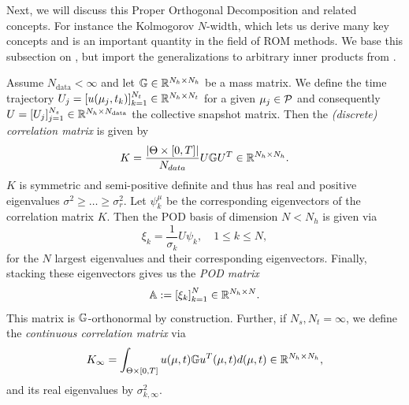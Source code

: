 Next, we will discuss this Proper Orthogonal Decomposition and related concepts. For instance the 
Kolmogorov $N$-width, which lets us derive many key concepts and is an important quantity in the field of ROM methods. 
We base this subsection on \cite{quarteroni2015rb}, but import the generalizations to arbitrary inner products from
\cite{franco2024}. 
\begin{definition} \label{def: POD}
    Assume $N_\text{data} < \infty$ and let $\mathbb{G} \in \mathbb{R}^{N_h \times N_h}$ be a mass matrix.
    We define the time trajectory $U_j = [u(\mu_j, t_k)]_{k = 1}^{N_t} \in \mathbb{R}^{N_h \times N_t}$ 
    for a given $\mu_j \in \mathcal{P}$ and consequently $U = [U_j]_{j=1}^{N_s}
    \in \mathbb{R}^{N_h \times N_\text{data}}$ 
    the collective snapshot matrix. Then the \emph{(discrete) correlation matrix} is given by
    \begin{equation} \label{eq: discrete correlation matrix}
        K = \frac{\vert \Theta \times [0, T] \vert}{N_{data}} U \mathbb{G} U^T \in \mathbb{R}^{N_h \times N_h}.
    \end{equation}
    $K$ is symmetric and semi-positive definite and thus has real and 
    positive eigenvalues $\sigma^2 \geq \dots \geq \sigma_r^2$. 
    Let $\psi^\mu_k$ be the corresponding eigenvectors of the correlation matrix $K$. 
    Then the POD basis of dimension $N < N_h$ is given via
    \begin{equation*}
        \xi_k = \frac{1}{\sigma_k} U \psi_k, \quad 1 \leq k \leq N,
    \end{equation*}
    for the $N$ largest eigenvalues and their corresponding eigenvectors. Finally, stacking these eigenvectors gives us
    the \emph{POD matrix}
    \begin{equation*}
        \mathbb{A} := \left[\xi_k\right]_{k=1}^N \in \mathbb{R}^{N_h \times N}.
    \end{equation*}
    This matrix is $\mathbb{G}$-orthonormal by construction.
    Further, if $N_s, N_t = \infty$, we define the \emph{continuous correlation matrix} via
    \begin{equation} \label{eq: continuous correlation matrix}
        K_\infty = \int_{\Theta \times [0, T]} u(\mu, t) \mathbb{G} u^T(\mu, t) d(\mu, t) \in \mathbb{R}^{N_h \times N_h},
    \end{equation}
    and its real eigenvalues by $\sigma_{k, \infty}^2$.
\end{definition}

